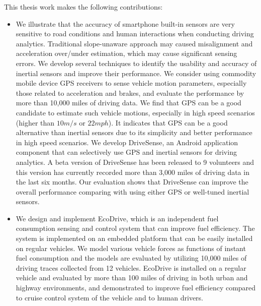 This thesis work makes the following contributions:
\begin{itemize}
\setlength\itemsep{0em}


\item We illustrate that the accuracy of smartphone built-in sensors are very sensitive
to road conditions and human interactions when conducting driving analytics. 
Traditional slope-unaware approach may caused misalignment and acceleration over/under
estimation, which may cause significant sensing errors. 
We develop several techniques to identify the usability and accuracy of inertial sensors 
and improve their performance.  
We consider using commodity mobile device GPS receivers to sense vehicle
motion parameters, especially those related to acceleration and brakes, 
and evaluate the performance by more than 
10,000 miles of driving data. 
We find that GPS can be a good candidate to estimate such vehicle
motions, especially in high speed scenarios (higher than $10m/s$ or $22mph$). 
It indicates that GPS can be a good alternative than inertial
sensors due to its simplicity and better performance in high speed
scenarios.  
We develop DriveSense, an Android application component that can 
selectively use GPS and inertial sensors for driving analytics. 
A beta version of DriveSense has been released to 9 volunteers and this version has
currently recorded more than 3,000 miles of driving data in the last six months.
Our evaluation shows that DriveSense can improve the overall performance 
comparing with using either GPS or well-tuned inertial sensors. 



\item We design and implement EcoDrive, 
which is an independent fuel consumption sensing and control system
that can improve fuel efficiency. 
The system is implemented on an embedded platform 
that can be easily installed on regular vehicles. 
We model various vehicle forces as functions of instant fuel consumption
and the models are evaluated by utilizing 
10,000 miles of driving traces collected from 12 vehicles. 
EcoDrive is installed on a regular vehicle and evaluated by more than 100 miles of driving in both urban and highway environments, 
and demonstrated to improve fuel efficiency compared to cruise control system
of the vehicle and to human drivers.  





\end{itemize}
